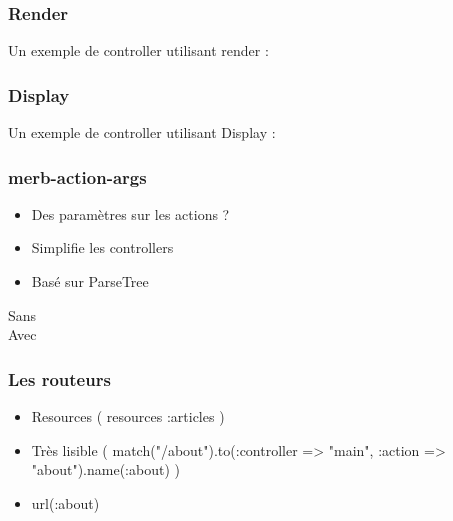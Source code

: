 \documentclass{beamer}
\begin{document}
\begin{frame}
    \frametitle{Render}

    Un exemple de controller utilisant render :

    \begin{center}
        
    \end{center}
\end{frame}

\begin{frame}
    \frametitle{Display}

    Un exemple de controller utilisant Display :


    \begin{center}
        
    \end{center}
\end{frame}

\begin{frame}
    \frametitle{merb-action-args}

    \begin{itemize}
        \item Des paramètres sur les actions ?
        \item Simplifie les controllers
        \item Basé sur ParseTree
    \end{itemize}
\end{frame}

\begin{frame}
    Sans
    \\
            

    Avec
    \\

            
\end{frame}

\begin{frame}
  \frametitle{Les routeurs}

  \begin{itemize}
    \item Resources ( resources :articles )
    \item Très lisible ( match("/about").to(:controller => "main", :action =>
                "about").name(:about) )
    \item url(:about)
  \end{itemize}
\end{frame}
\end{document}
